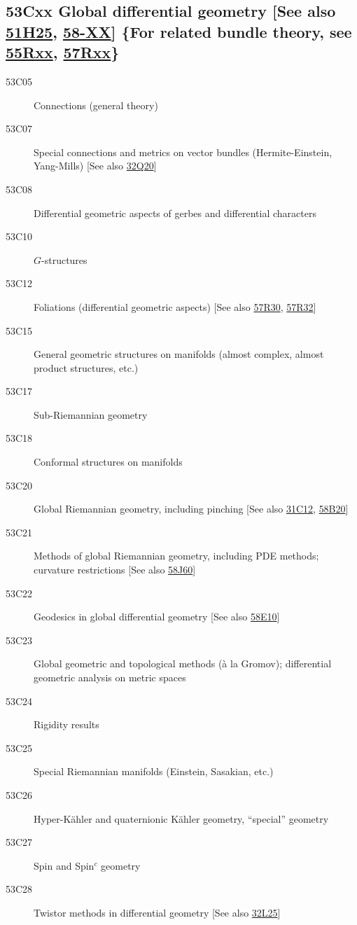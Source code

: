 \documentclass[letterpaper]{article}
\begin{document}
\subsection*{53Cxx  Global differential geometry [See also \hyperref[51H25]{51H25}, \hyperref[58-XX]{58-XX}] \{For related bundle theory, see \hyperref[55Rxx]{55Rxx}, \hyperref[57Rxx]{57Rxx}\} }\label{53Cxx}
\begin{description}  
\item [53C05]\label{53C05} Connections (general theory)
\item [53C07]\label{53C07} Special connections and metrics on vector bundles (Hermite-Einstein, Yang-Mills) [See also \hyperref[32Q20]{32Q20}]
\item [53C08]\label{53C08} Differential geometric aspects of gerbes and differential characters
\item [53C10]\label{53C10} $G$-structures
\item [53C12]\label{53C12} Foliations (differential geometric aspects) [See also \hyperref[57R30]{57R30}, \hyperref[57R32]{57R32}]
\item [53C15]\label{53C15} General geometric structures on manifolds (almost complex, almost product structures, etc.)
\item [53C17]\label{53C17} Sub-Riemannian geometry
\item [53C18]\label{53C18} Conformal structures on manifolds
\item [53C20]\label{53C20} Global Riemannian geometry, including pinching [See also \hyperref[31C12]{31C12}, \hyperref[58B20]{58B20}]
\item [53C21]\label{53C21} Methods of global  Riemannian geometry, including PDE methods; curvature restrictions [See also \hyperref[58J60]{58J60}]
\item [53C22]\label{53C22} Geodesics in global differential geometry [See also \hyperref[58E10]{58E10}]
\item [53C23]\label{53C23} Global geometric and topological methods (\`{a} la Gromov); differential geometric analysis on metric spaces
\item [53C24]\label{53C24} Rigidity results 
\item [53C25]\label{53C25} Special Riemannian manifolds (Einstein, Sasakian, etc.)
\item [53C26]\label{53C26} Hyper-K\"{a}hler and quaternionic K\"{a}hler geometry, ``special'' geometry
\item [53C27]\label{53C27} Spin and Spin${}^c$ geometry
\item [53C28]\label{53C28} Twistor methods in differential geometry [See also \hyperref[32L25]{32L25}]

\end{description}
\end{document}
